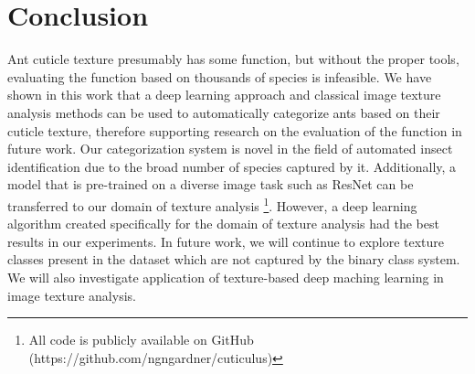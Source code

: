 \documentclass{aci}
\numberwithin{equation}{section}
\begin{document}
\section{Conclusion}
Ant cuticle texture presumably has some function, but without the proper tools,
evaluating the function based on thousands of species is infeasible. We have
shown in this work that a deep learning approach and classical image texture
analysis methods can be used to automatically categorize ants based on their
cuticle texture, therefore supporting research on the evaluation of the function
in future work. Our categorization system is novel in the field of automated
insect identification due to the broad number of species captured by it.
Additionally, a model that is pre-trained on a diverse image task such as ResNet
can be transferred to our domain of texture analysis \footnote{All code is
    publicly available on GitHub (https://github.com/ngngardner/cuticulus)}.
However, a deep learning algorithm created specifically for the domain of
texture analysis had the best results in our experiments. In future work, we
will continue to explore texture classes present in the dataset which are not
captured by the binary class system. We will also investigate application of
texture-based deep maching learning in image texture analysis.



\end{document}
